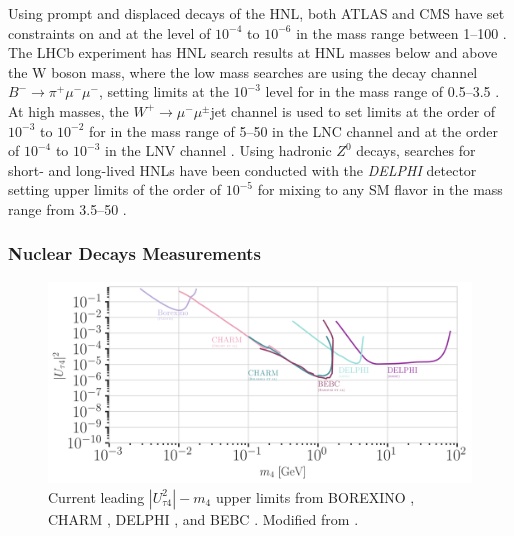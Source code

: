 Using prompt and displaced decays of the HNL, both ATLAS and CMS have set constraints on  and  at the level of $10^{-4}$ to $10^{-6}$ in the mass range between \SIrange{1}{100}{\gev} . The LHCb experiment has HNL search results at HNL masses below and above the W boson mass, where the low mass searches are using the decay channel $B^- \rightarrow \pi^+ \mu^- \mu^-$, setting limits at the $10^{-3}$ level for  in the mass range of \SIrange{0.5}{3.5}{\gev} . At high masses, the $W^+ \rightarrow \mu^- \mu^\pm$jet channel is used to set limits at the order of $10^{-3}$ to $10^{-2}$ for  in the mass range of \SIrange{5}{50}{\gev} in the LNC channel and at the order of $10^{-4}$ to $10^{-3}$ in the LNV channel . Using hadronic $Z^0$ decays, searches for short- and long-lived HNLs have been conducted with the \textit{DELPHI} detector setting upper limits of the order of $10^{-5}$ for mixing to any SM flavor in the mass range from \SIrange{3.5}{50}{\gev} . 


\subsubsection{Nuclear Decays Measurements}

\begin{figure}[t]
    \includegraphics{figures/hnl_simulation/theory/UtauN_majorana.png}
      \caption[Current leading $|U_{\tau4}^2|-m_4$ upper limits]{Current leading $|U_{\tau4}^2|-m_4$ upper limits from BOREXINO \cite{Plestid:2020vqf}, CHARM \cite{Orloff:2002de, Boiarska:2021yho}, DELPHI \cite{DELPHI:1996qcc}, and BEBC \cite{Barouki:2022bkt}. Modified from \cite{hoster_limitFernandez-Martinez:2023phj}.}
\end{figure}

